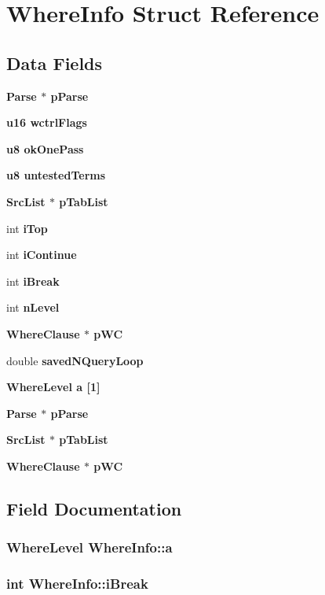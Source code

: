 \section{Where\-Info Struct Reference}
\label{structWhereInfo}
\subsection*{Data Fields}
\begin{CompactItemize}
\item 
\bf{Parse} $\ast$ \bf{p\-Parse}
\item 
\bf{u16} \bf{wctrl\-Flags}
\item 
\bf{u8} \bf{ok\-One\-Pass}
\item 
\bf{u8} \bf{untested\-Terms}
\item 
\bf{Src\-List} $\ast$ \bf{p\-Tab\-List}
\item 
int \bf{i\-Top}
\item 
int \bf{i\-Continue}
\item 
int \bf{i\-Break}
\item 
int \bf{n\-Level}
\item 
\bf{Where\-Clause} $\ast$ \bf{p\-WC}
\item 
double \bf{saved\-NQuery\-Loop}
\item 
\bf{Where\-Level} \bf{a} [1]
\item 
\bf{Parse} $\ast$ \bf{p\-Parse}
\item 
\bf{Src\-List} $\ast$ \bf{p\-Tab\-List}
\item 
\bf{Where\-Clause} $\ast$ \bf{p\-WC}
\end{CompactItemize}


\subsection{Field Documentation}
\subsubsection{\setlength{\rightskip}{0pt plus 5cm}\bf{Where\-Level} \bf{Where\-Info::a}}\label{structWhereInfo_9ca58b476c8f15823540866ca5d4feeb}


\subsubsection{\setlength{\rightskip}{0pt plus 5cm}int \bf{Where\-Info::i\-Break}}\label{structWhereInfo_d1ffaca93af6d1c3b8f01a7db9de963e}



